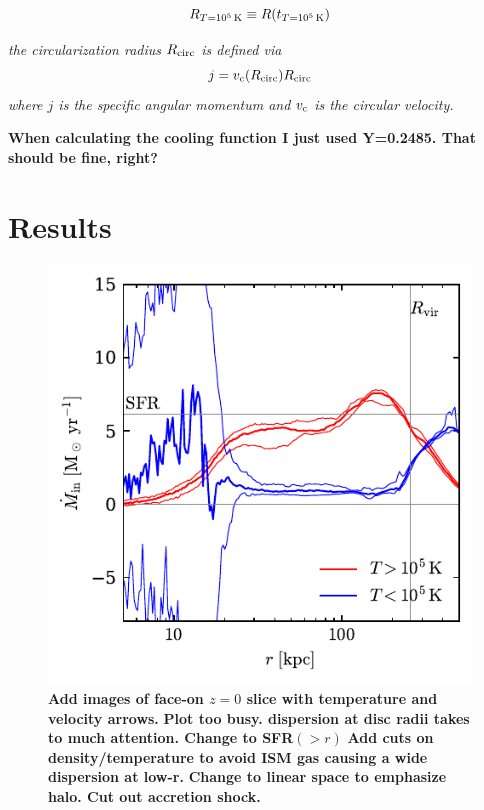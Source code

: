 \documentclass[fleqn,usenatbib]{mnras}
\newcommand{\Rcool}{R_{T=10^5\,{\rm K}}}
\newcommand{\Rcirc}{R_{\rm circ}} %
\begin{document}
\begin{equation}
    \Rcool \equiv R(t_{T=10^5\,{\rm K}})
\end{equation}


\textit{the circularization radius $\Rcirc$ is defined via}
\begin{equation}
    j = v_{\rm c}(\Rcirc)\Rcirc
\end{equation}
\textit{where $j$ is the specific angular momentum and $v_{\rm c}$ is the circular velocity.}

\textbf{When calculating the cooling function I just used Y=0.2485. That should be fine, right?}

\section{Results}

\begin{figure}
    \centering
    \includegraphics{Mdot_m12i.pdf}
    \caption{
    \textbf{Add images of face-on $z=0$ slice with temperature and velocity arrows.}
    \textbf{Plot too busy. dispersion at disc radii takes to much attention. Change to SFR$(>r)$}
    \textbf{Add cuts on density/temperature to avoid ISM gas causing a wide dispersion at low-r.}
    \textbf{Change to linear space to emphasize halo. Cut out accretion shock.}
    }
    \label{f:Mdot}
\end{figure}
\end{document}
